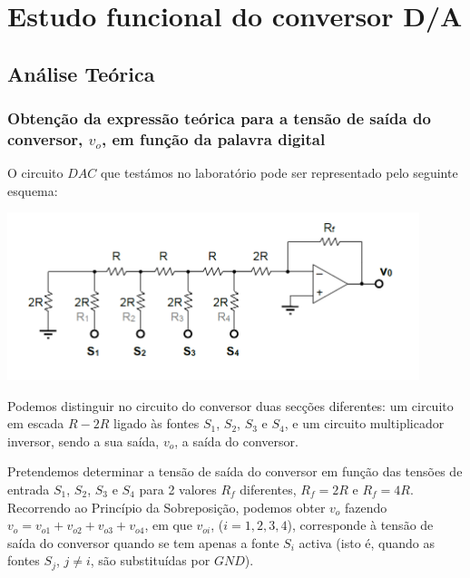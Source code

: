 \documentclass[a4paper,11pt]{report}
\begin{document}


\chapter{Estudo funcional do conversor D/A}

\section{Análise Teórica}

\subsection{Obtenção da expressão teórica para a tensão de saída do conversor, $v_o$, em função da palavra digital}

\hspace{15pt}O circuito $DAC$ que testámos no laboratório pode ser representado pelo seguinte esquema:


\begin{center}
     \includegraphics[angle=0,width=0.9\textwidth]{Conversor.png}
     \label{fig:Conversor}
     \end{center}


Podemos distinguir no circuito do conversor duas secções diferentes: um circuito em escada $R-2R$ ligado às fontes $S_1$, $S_2$, $S_3$ e $S_4$, e um circuito multiplicador inversor, sendo a sua saída, $v_o$, a saída do conversor.

Pretendemos determinar a tensão de saída do conversor em função das tensões de entrada $S_1$, $S_2$, $S_3$ e $S_4$ para 2 valores $R_f$ diferentes, $R_f=2R$ e $R_f=4R$. Recorrendo ao Princípio da Sobreposição, podemos obter $v_o$ fazendo $v_o=v_{o1}+v_{o2}+v_{o3}+v_{o4}$, em que $v_{oi}$, ($i=1,2,3,4$), corresponde à tensão de saída do conversor quando se tem apenas a fonte $S_i$ activa (isto é, quando as fontes $S_j$, $j\neq i$, são substituídas por $GND$).\\
\par
\end{document}

